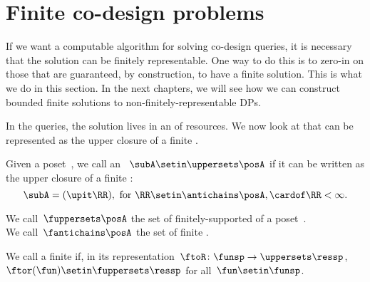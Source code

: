 \section{Finite co-design problems}

If we want a computable algorithm for solving co-design queries, it is necessary that the solution can be finitely representable.
One way to do this is to zero-in on those  that are guaranteed, by construction, to have a finite solution.
This is what we do in this section.
In the next chapters, we will see how we can construct bounded finite solutions to non-finitely-representable DPs.

In the \FixFunMinRes queries, the solution lives in an  of resources.
We now look at  that can be represented as the upper closure of a finite .

\begin{definition}
    \label{def:fuppersets}
    Given a poset~\posA, we call an ~$\subA \setin \uppersets \posA$ 
    if it can be written as the upper closure of a finite :
    \begin{equation}
        \subA = (\upit\RR), \text{ for } \RR \setin \antichains \posA, \cardof\RR < \infty.
    \end{equation}

\end{definition}
We call~$\fuppersets \posA$ the set of finitely-supported  of a poset~\posA.
\\
We call~$\fantichains \posA$ the set of finite .

\begin{definition}
    \label{def:finite_des_prob}
    We call a  finite if, in its representation~$\ftoR \colon \funsp \to \uppersets \ressp$,
    ~$\ftor(\fun) \setin \fuppersets\ressp$ for all~$\fun\setin\funsp$.
\end{definition}

